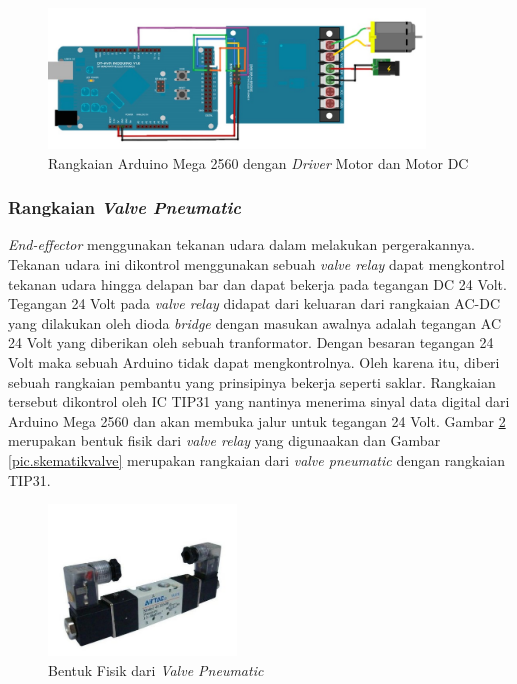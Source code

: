 \begin{figure}[H]
	\centering
	\includegraphics[width=10cm]{gambar/drivermotor.jpg}
	\caption{Rangkaian Arduino Mega 2560 dengan \textit{Driver} Motor dan Motor DC}
	\label{pic.motordcdriver}
\end{figure}
\subsubsection{Rangkaian \textit{Valve Pneumatic}}
\textit{End-effector} menggunakan tekanan udara dalam melakukan pergerakannya. Tekanan udara ini dikontrol menggunakan sebuah \textit{valve relay} dapat mengkontrol tekanan udara hingga delapan bar dan dapat bekerja pada tegangan DC 24 Volt. Tegangan 24 Volt pada \textit{valve relay} didapat dari keluaran dari rangkaian AC-DC yang dilakukan oleh dioda \textit{bridge} dengan masukan awalnya adalah tegangan AC 24 Volt yang diberikan oleh sebuah tranformator. Dengan besaran tegangan 24 Volt maka sebuah Arduino tidak dapat mengkontrolnya. Oleh karena itu, diberi sebuah rangkaian pembantu yang prinsipinya bekerja seperti saklar. Rangkaian tersebut dikontrol oleh IC TIP31 yang nantinya  menerima sinyal data digital dari Arduino Mega 2560 dan akan membuka jalur untuk tegangan 24 Volt. Gambar \ref{pic.fisikvalve} merupakan bentuk fisik dari \textit{valve relay} yang digunaakan dan Gambar \ref{pic.skematikvalve} merupakan rangkaian dari \textit{valve pneumatic} dengan rangkaian TIP31.
\begin{figure}[H]
	\centering
	\includegraphics[width=5cm]{gambar/relay.jpg}
	\caption{Bentuk Fisik dari \textit{Valve Pneumatic}}
	\label{pic.fisikvalve}
\end{figure}
